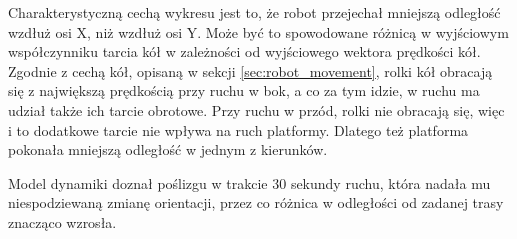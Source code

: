 		Charakterystyczną cechą wykresu jest to, że robot przejechał mniejszą odległość wzdłuż osi X, niż wzdłuż osi Y.
		Może być to spowodowane różnicą w wyjściowym współczynniku tarcia kół w zależności od wyjściowego wektora prędkości kół.
		Zgodnie z cechą kół, opisaną w sekcji \ref{sec:robot_movement}, rolki kół obracają się z największą prędkością przy ruchu w bok, a co za tym idzie, w ruchu ma udział także
		ich tarcie obrotowe. Przy ruchu w przód, rolki nie obracają się, więc i to dodatkowe tarcie nie wpływa na ruch platformy.
		Dlatego też platforma pokonała mniejszą odległość w jednym z kierunków.
		
		Model dynamiki doznał poślizgu w trakcie 30 sekundy ruchu, która nadała mu niespodziewaną zmianę orientacji, przez co różnica w odległości od zadanej trasy znacząco wzrosła.
		
